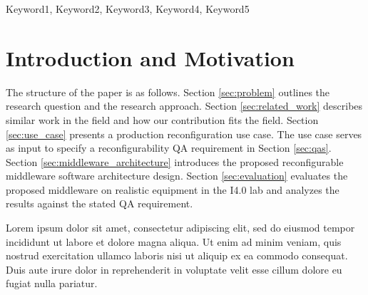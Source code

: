 \documentclass[conference]{IEEEtran}
\begin{document}

\maketitle
\IEEEpubidadjcol
\begin{abstract}

    



\end{abstract}

\begin{IEEEkeywords}
Keyword1, Keyword2, Keyword3, Keyword4, Keyword5
\end{IEEEkeywords}

\section{Introduction and Motivation}

The structure of the paper is as follows. 
Section \ref{sec:problem} outlines the research question and the research approach. 
Section \ref{sec:related_work} describes similar work in the field and how our contribution fits the field.
Section \ref{sec:use_case} presents a production reconfiguration use case.
The use case serves as input to specify a reconfigurability QA requirement in Section \ref{sec:qas}.
Section \ref{sec:middleware_architecture} introduces the proposed reconfigurable middleware software architecture design.
Section \ref{sec:evaluation} evaluates the proposed middleware on realistic equipment in the I4.0 lab and analyzes the results against the stated QA requirement.   

Lorem ipsum dolor sit amet, consectetur adipiscing elit, sed do eiusmod tempor incididunt ut labore et dolore magna aliqua. Ut enim ad minim veniam, quis nostrud exercitation ullamco laboris nisi ut aliquip ex ea commodo consequat. Duis aute irure dolor in reprehenderit in voluptate velit esse cillum dolore eu fugiat nulla pariatur.
\end{document}
